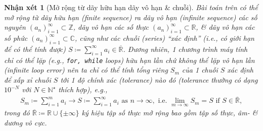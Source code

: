 \documentclass{article}
\newtheorem{nhanxet}{Nhận xét}
\begin{document}
\begin{nhanxet}[Mở rộng từ dãy hữu hạn dãy vô hạn \& chuỗi]
	Bài toán trên có thể mở rộng từ dãy hữu hạn (finite sequence) ra dãy vô hạn (infinite sequence) các số nguyên $(a_n)_{i=1}^\infty\subset\mathbb{Z}$, dãy vô hạn các số thực $(a_n)_{i=1}^\infty\subset\mathbb{R}$, \& dãy vô hạn các số phức $(a_n)_{i=1}^\infty\subset\mathbb{C}$, cũng như các chuỗi (series) ``xác định'' (i.e., có giới hạn để có thể tính được) $S\coloneqq\sum_{i=1}^\infty a_i\in\overline{\mathbb{R}}$. Đương nhiên, 1 chương trình máy tính chỉ có thể lặp (e.g., \texttt{for, while} loops) hữu hạn lần chứ không thể lặp vô hạn lần (infinite loop error) nên ta chỉ có thể tính tổng riêng $S_m$ của 1 chuỗi $S$ xác định để xấp xỉ chuỗi $S$ tới 1 độ chính xác (tolerance) nào đó (tolerance thường có dạng $10^{-N}$ với $N\in\mathbb{N}^\star$ thích hợp), e.g.,
	\begin{align*}
		S_m\coloneqq\sum_{i=1}^m a_i\to S\coloneqq\sum_{i=1}^\infty a_i\mbox{ as } n\to\infty,\mbox{ i.e. } \lim_{m\to\infty} S_m = S\mbox{ if } S\in\overline{\mathbb{R}},
	\end{align*}
	trong đó $\overline{\mathbb{R}}\coloneqq\mathbb{R}\cup\{\pm\infty\}$ ký hiệu tập số thực mở rộng bao gồm tập số thực, âm- \& dương vô cực.
\end{nhanxet}
\end{document}
